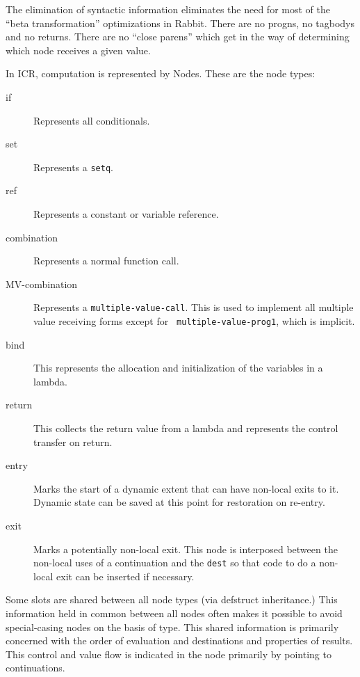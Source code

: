 The elimination of syntactic information eliminates the need for most of the
``beta transformation'' optimizations in Rabbit.  There are no progns, no
tagbodys and no returns.  There are no ``close parens'' which get in the way of
determining which node receives a given value.

In ICR, computation is represented by Nodes.  These are the node types:
\begin{description}
\item[if]  Represents all conditionals.

\item[set] Represents a {\tt setq}.

\item[ref] Represents a constant or variable reference.

\item[combination] Represents a normal function call.

\item[MV-combination] Represents a {\tt multiple-value-call}.  This is used to
implement all multiple value receiving forms except for {\tt
multiple-value-prog1}, which is implicit.

\item[bind]
This represents the allocation and initialization of the variables in
a lambda.

\item[return]
This collects the return value from a lambda and represents the
control transfer on return.

\item[entry] Marks the start of a dynamic extent that can have non-local exits
to it.  Dynamic state can be saved at this point for restoration on re-entry.

\item[exit] Marks a potentially non-local exit.  This node is interposed
between the non-local uses of a continuation and the {\tt dest} so that code to
do a non-local exit can be inserted if necessary.
\end{description}

Some slots are shared between all node types (via defstruct inheritance.)  This
information held in common between all nodes often makes it possible to avoid
special-casing nodes on the basis of type.  This shared information is
primarily concerned with the order of evaluation and destinations and
properties of results.  This control and value flow is indicated in the node
primarily by pointing to continuations.

